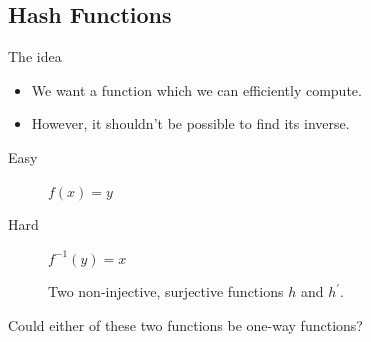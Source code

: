 \subsection{Hash Functions}

\begin{frame}
  \begin{block}{The idea}
    \begin{itemize}
      \item We want a function which we can efficiently compute.

        \pause{}

      \item However, it shouldn't be possible to find its inverse.
    \end{itemize}
  \end{block}

  \pause{}

  \begin{example}
    \begin{description}
      \item[Easy] \(f(x) = y\)
      \item[Hard] \(f^{-1}(y) = x\)
    \end{description}
  \end{example}
\end{frame}

\begin{frame}
  \begin{figure}
    \hspace{0.1\textwidth}
    \caption{%
      Two non-injective, surjective functions \(h\) and \(h^\prime\).
    }
  \end{figure}

  \begin{exercise}
    Could either of these two functions be one-way functions?
  \end{exercise}
\end{frame}

